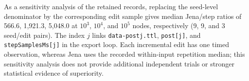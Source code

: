 As a sensitivity analysis of the retained records, replacing the seed-level denominator by the corresponding edit sample gives median Jena/step ratios of 566.6, 1,921.3, 5,048.0 at $10^3$, $10^4$, and $10^5$ nodes, respectively (9, 9, and 3 seed/edit pairs). The index $j$ links \texttt{data-postj.ttl}, \texttt{post[j]}, and \texttt{stepSamplesMs[j]} in the export loop. Each incremental edit has one timed observation, whereas Jena uses the recorded within-input repetition median; this sensitivity analysis does not provide additional independent trials or stronger statistical evidence of superiority.
